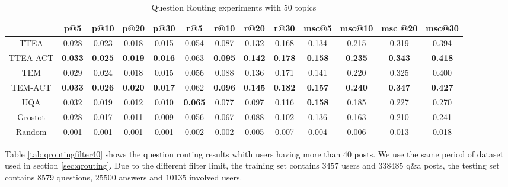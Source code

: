{{{{{{{\begin{sidewaystable}
\caption{Question Routing experiments with 50 topics}
\label{tab:qroutingtop50}
\centering
\begin{tabular}{|c|c|c|c|c|c|c|c|c|c|c|c|c|}
\hline
 & p@5    &p@10    &p@20   & p@30 &r@5 & r@10 & r@20 &r@30 & msc@5 & msc@10 &msc @20 &msc@30  \\ \hline
TTEA&0.028&0.023&0.018&0.015&0.054&0.087&0.132&0.168&0.134&0.215&0.319&0.394 \\ \hline
TTEA-ACT&\textbf{0.033}&\textbf{0.025}&\textbf{0.019}&\textbf{0.016}&0.063&\textbf{0.095}&\textbf{0.142}&\textbf{0.178}&\textbf{0.158}&\textbf{0.235}&\textbf{0.343}&\textbf{0.418} \\ \hline
TEM&0.029&0.024&0.018&0.015&0.056&0.088&0.136&0.171&0.141&0.220&0.325&0.400 \\ \hline
TEM-ACT&\textbf{0.033}&\textbf{0.026}&\textbf{0.020}&\textbf{0.017}&0.062&\textbf{0.096}&\textbf{0.145}&\textbf{0.182}&\textbf{0.157}&\textbf{0.240}&\textbf{0.347}&\textbf{0.427} \\ \hline
UQA&0.032&0.019&0.012&0.010&\textbf{0.065}&0.077&0.097&0.116&\textbf{0.158}&0.185&0.227&0.270 \\ \hline
Grostot&0.028&0.017&0.011&0.009&0.056&0.067&0.088&0.102&0.136&0.163&0.210&0.241 \\ \hline
Random&0.001&0.001&0.001&0.001&0.002&0.002&0.005&0.007&0.004&0.006&0.013&0.018 \\ \hline
\end{tabular}
\end{sidewaystable}


Table \ref{tab:qroutingfilter40} shows the question routing results whith users having more than 40 posts. We use the same period of dataset used in section \ref{sec:qrouting}. Due to the different filter limit, the training set contains $3457$ users and $338485$ q\&a posts, the testing set contains $8579$ questions, $25500$ answers and $10135$ involved users.

}}}}}}}
